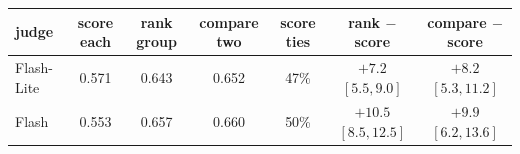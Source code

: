 \begin{tabular}{lcccccc}
\toprule
judge & score each & rank group & compare two & score ties & rank $-$ score & compare $-$ score \\
\midrule
Flash-Lite & 0.571 & 0.643 & 0.652 & 47\% & $+7.2$ $[5.5, 9.0]$ & $+8.2$ $[5.3, 11.2]$ \\
Flash & 0.553 & 0.657 & 0.660 & 50\% & $+10.5$ $[8.5, 12.5]$ & $+9.9$ $[6.2, 13.6]$ \\
\bottomrule
\end{tabular}
